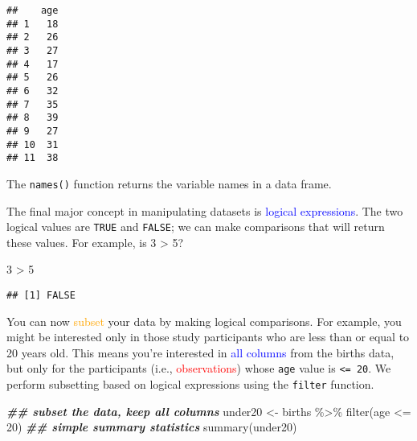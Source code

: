 \documentclass[
]{article}
\newenvironment{Shaded}{\begin{snugshade}}{\end{snugshade}}
\newcommand{\DecValTok}[1]{\textcolor[rgb]{0.00,0.00,0.81}{#1}}
\newcommand{\DocumentationTok}[1]{\textcolor[rgb]{0.56,0.35,0.01}{\textbf{\textit{#1}}}}
\newcommand{\FunctionTok}[1]{\textcolor[rgb]{0.00,0.00,0.00}{#1}}
\newcommand{\NormalTok}[1]{#1}
\newcommand{\OtherTok}[1]{\textcolor[rgb]{0.56,0.35,0.01}{#1}}
\newcommand{\SpecialCharTok}[1]{\textcolor[rgb]{0.00,0.00,0.00}{#1}}
\begin{document}
\begin{verbatim}
##    age
## 1   18
## 2   26
## 3   27
## 4   17
## 5   26
## 6   32
## 7   35
## 8   39
## 9   27
## 10  31
## 11  38
\end{verbatim}

The \texttt{names()} function returns the variable names in a data
frame.

The final major concept in manipulating datasets is
\textcolor{blue}{logical expressions}. The two logical values are
\texttt{TRUE} and \texttt{FALSE}; we can make comparisons that will
return these values. For example, is 3 \textgreater{} 5?

\begin{Shaded}
\begin{Highlighting}[]
\DecValTok{3} \SpecialCharTok{\textgreater{}} \DecValTok{5}
\end{Highlighting}
\end{Shaded}

\begin{verbatim}
## [1] FALSE
\end{verbatim}

You can now \textcolor{orange}{subset} your data by making logical
comparisons. For example, you might be interested only in those study
participants who are less than or equal to 20 years old. This means
you're interested in \textcolor{blue}{all columns} from the births data,
but only for the participants (i.e., \textcolor{red}{observations})
whose \texttt{age} value is \texttt{\textless{}=\ 20}. We perform
subsetting based on logical expressions using the \texttt{filter}
function.

\begin{Shaded}
\begin{Highlighting}[]
\DocumentationTok{\#\# subset the data, keep all columns}
\NormalTok{under20 }\OtherTok{\textless{}{-}}\NormalTok{ births }\SpecialCharTok{\%\textgreater{}\%} \FunctionTok{filter}\NormalTok{(age }\SpecialCharTok{\textless{}=} \DecValTok{20}\NormalTok{)}
\DocumentationTok{\#\# simple summary statistics}
\FunctionTok{summary}\NormalTok{(under20)}
\end{Highlighting}
\end{Shaded}
\end{document}
